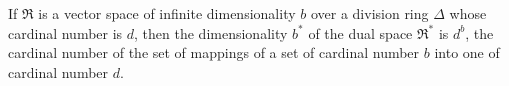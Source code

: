 If $\mathfrak{R}$ is a vector space of infinite dimensionality $b$ over a division ring $\Delta$ whose cardinal number is $d$, then the dimensionality $b^*$ of the dual space $\mathfrak{R}^*$ is $d^b$, the cardinal number of the set of mappings of a set of cardinal number $b$ into one of cardinal number $d$.
